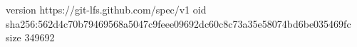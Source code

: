 version https://git-lfs.github.com/spec/v1
oid sha256:562d4c70b79469568a5047c9feee09692dc60c8c73a35e58074bd6be035469fc
size 349692
